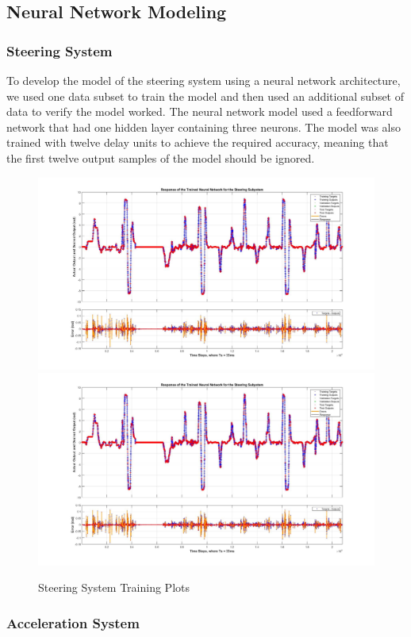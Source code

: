 \documentclass[journal,twoside,web]{ieeecolor}
\begin{document}
\subsection{Neural Network Modeling}
\label{sec:NN-Modeling}

\subsubsection{Steering System}

To develop the model of the steering system using a neural network architecture, we used one data subset to train the model and then used an additional subset of data to verify the model worked. The neural network model used a feedforward network that had one hidden layer containing three neurons. The model was also trained with twelve delay units to achieve the required accuracy, meaning that the first twelve output samples of the model should be ignored.

\begin{figure}[htbp]
	\centering
		{\includegraphics[width=0.48\linewidth]{figs/img/steeringNeuralNetworkTrainedOutput}}
		{\includegraphics[width=0.48\linewidth]{figs/img/steeringNeuralNetworkTrainedOutput}}
	\caption{Steering System Training Plots}
\end{figure}


\subsubsection{Acceleration System}
\end{document}
